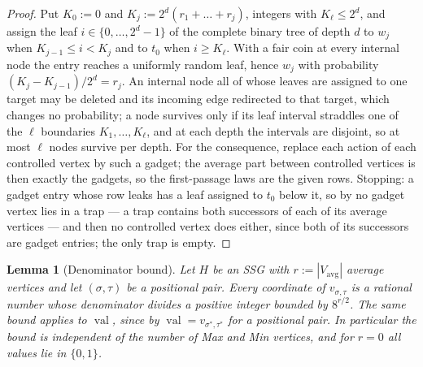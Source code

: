 \documentclass[11pt]{article}
\theoremstyle{plain}
\newtheorem{lemma}[theorem]{Lemma}
\theoremstyle{definition}
\DeclareMathOperator{\val}{val}
\newcommand{\Vavg}{V_{\mathrm{avg}}}
\begin{document}
\begin{proof}
Put $K_0:=0$ and $K_j:=2^{d}(r_1+\dots+r_j)$, integers with
$K_\ell\le2^{d}$, and assign the leaf $i\in\{0,\dots,2^{d}-1\}$ of the
complete binary tree of depth $d$ to $w_j$ when $K_{j-1}\le i<K_j$ and to
$t_0$ when $i\ge K_\ell$. With a fair coin at every internal node the
entry reaches a uniformly random leaf, hence $w_j$ with probability
$(K_j-K_{j-1})/2^{d}=r_j$. An internal node all of whose leaves are
assigned to one target may be deleted and its incoming edge redirected to
that target, which changes no probability; a node survives only if its
leaf interval straddles one of the $\ell$ boundaries $K_1,\dots,K_\ell$,
and at each depth the intervals are disjoint, so at most $\ell$ nodes
survive per depth. For the consequence, replace each action of each
controlled vertex by such a gadget; the average part between controlled
vertices is then exactly the gadgets, so the first-passage laws are the
given rows. Stopping: a gadget entry whose row leaks has a leaf assigned to
$t_0$ below it, so by  no gadget vertex lies in a trap
--- a trap contains both successors of each of its average vertices ---
and then no controlled vertex does either, since both of its successors
are gadget entries; the only trap is empty.
\end{proof}


\begin{lemma}[Denominator bound]\label{lem:denominator}
Let $H$ be an SSG with $r:=|\Vavg|$ average vertices and let
$(\sigma,\tau)$ be a positional pair. Every coordinate of
$v_{\sigma,\tau}$ is a rational number whose denominator divides a
positive integer bounded by $8^{r/2}$. The same bound applies to $\val$,
since by  $\val=v_{\sigma^\ast,\tau^\ast}$ for a
positional pair. In particular the bound is independent of the number of
Max and Min vertices, and for $r=0$ all values lie in $\{0,1\}$.
\end{lemma}
\end{document}
